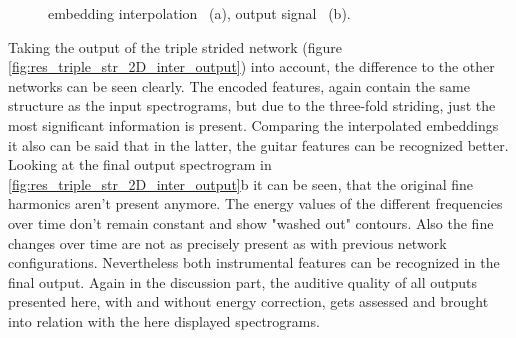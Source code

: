\begin{figure}[htb!]
    \centering
    \caption{embedding interpolation ~(a), output signal ~(b).}
    \label{fig:res_double_str_2D_inter_output}
\end{figure}

Taking the output of the triple strided network (figure \ref{fig:res_triple_str_2D_inter_output}) into account, the difference to the other networks can be seen clearly. The encoded features, again contain the same structure as the input spectrograms, but due to the three-fold striding, just the most significant information is present. Comparing the interpolated embeddings it also can be said that in the latter, the guitar features can be recognized better. Looking at the final output spectrogram in \ref{fig:res_triple_str_2D_inter_output}b it can be seen, that the original fine harmonics aren't present anymore. The energy values of the different frequencies over time don't remain constant and show "washed out" contours. Also the fine changes over time are not as precisely present as with previous network configurations. Nevertheless both instrumental features can be recognized in the final output. Again in the discussion part, the auditive quality of all outputs presented here, with and without energy correction, gets assessed and brought into relation with the here displayed spectrograms.

